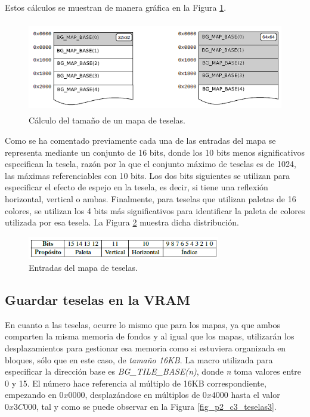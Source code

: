 Estos cálculos se muestran de manera gráfica en la Figura \ref{fig_p2_c3_teselas2b}.

\begin{figure}[t]
\centering
\includegraphics[height=4cm]{Figuras/C7/c7_mem_teselas2.PNG}
\caption{Cálculo del tamaño de un mapa de teselas.}
\label{fig_p2_c3_teselas2b}
\end{figure}

Como se ha comentado previamente cada una de las entradas del mapa se representa mediante un conjunto de 16 bits, donde los 10 bits menos significativos especifican la tesela, razón por la que el conjunto máximo de teselas es de  1024, las máximas referenciables con 10 bits. Los dos bits siguientes se utilizan para especificar el efecto de espejo en la tesela, es decir, si tiene una reflexión horizontal, vertical o ambas. Finalmente, para teselas que utilizan paletas de 16 colores, se utilizan los 4 bits más significativos para identificar la paleta de colores utilizada por esa tesela. La Figura \ref{fig_p2_c3_entmapateselas} muestra dicha distribución.

\begin{figure}[t]
\centering
\includegraphics[height=1cm]{Figuras/C7/c7_bits_teselas.PNG}
\caption{Entradas del mapa de teselas.}
\label{fig_p2_c3_entmapateselas}
\end{figure}

\subsection{Guardar teselas en la VRAM}
En cuanto a las teselas, ocurre lo mismo que para los mapas, ya que ambos comparten la misma memoria de fondos y al igual que los mapas, utilizarán los desplazamientos para gestionar esa memoria como si estuviera organizada en bloques, sólo que en este caso, de \textit{tamaño 16KB}. La macro utilizada para especificar la dirección base es \textit{BG\_TILE\_BASE(n)}, donde \textit{n} toma valores entre 0 y 15. El número hace referencia al múltiplo de 16KB correspondiente, empezando en $0x0000$, desplazándose en múltiplos de $0x4000$ hasta el valor $0x3C000$, tal y como se puede observar en la Figura \ref{fig_p2_c3_teselas3}. 

